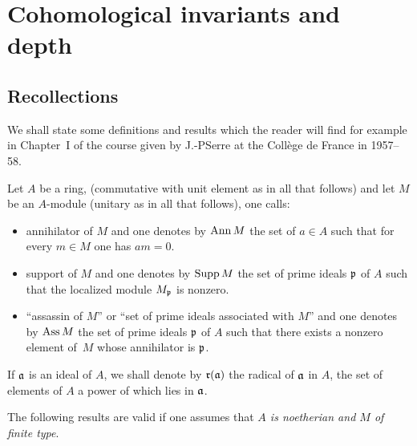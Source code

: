 \chapter{Cohomological invariants and depth} \label{III}

\section{Recollections} \label{III.1}

We shall state some definitions and results which the reader will find
for example in Chapter~I of the course given by J.-P\ptbl Serre at the
Coll\`ege de France in 1957--58.

\begin{definition} \label{def:III.1.1}
Let \(A\) be a ring, (commutative with unit element as in all that
follows) and let \(M\) be an \(A\)-module (unitary as in all that
follows), one calls:
\begin{itemize}
\item
annihilator of \(M\) and one denotes by \(\operatorname{Ann} M\) the set of
\(a\in A\) such that for every \(m\in M\) one has \(am=0\).

\item
support of \(M\) and one denotes by \(\operatorname{Supp} M\) the set of prime
ideals \(\mathfrak{p} \) of \(A\) such that the localized module \(M_{\mathfrak{p}}\) is
nonzero.

\item
``assassin of \(M\)'' or ``set of prime ideals associated with \(M\)''
and one denotes by \(\operatorname{Ass} M\) the set of prime ideals \(\mathfrak{p} \) of \(A\)
such that there exists a nonzero element of~\(M\) whose annihilator is
\(\mathfrak{p} \).
\end{itemize}

If \(\mathfrak{a}\) is an ideal of \(A\), we shall denote by
\(\mathfrak{r}(\mathfrak{a})\) the radical of \(\mathfrak{a}\) in \(A\), \ie the set of
elements of \(A\) a power of which lies in \(\mathfrak{a}\).
\end{definition}

The following results are valid if one assumes that
\emph{\(A\) is noetherian and \(M\) of finite type}.

